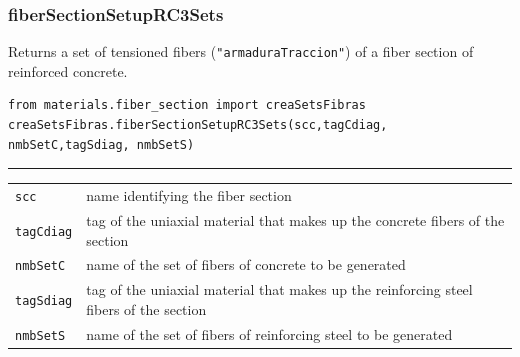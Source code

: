\subsubsection{fiberSectionSetupRC3Sets}
Returns a set of tensioned fibers (\verb|"armaduraTraccion"|) of a fiber section of reinforced concrete.
\begin{verbatim}
from materials.fiber_section import creaSetsFibras
creaSetsFibras.fiberSectionSetupRC3Sets(scc,tagCdiag, nmbSetC,tagSdiag, nmbSetS)
\end{verbatim}
\vspace{-10pt}
{\color{grayLines} \rule{\linewidth}{0.25pt}}
\begin{center}
\begin{tabular}{lp{10cm}}
{\tt scc} & name identifying the fiber section \\
{\tt tagCdiag} & tag of the uniaxial material that makes up the concrete fibers of the section \\
{\tt nmbSetC} & name of the set of fibers of concrete to be generated \\
{\tt tagSdiag} & tag of the uniaxial material that makes up the reinforcing steel fibers of the section \\
{\tt nmbSetS} & name of the set of fibers of reinforcing steel to be generated \\
\end{tabular}
\end{center}

